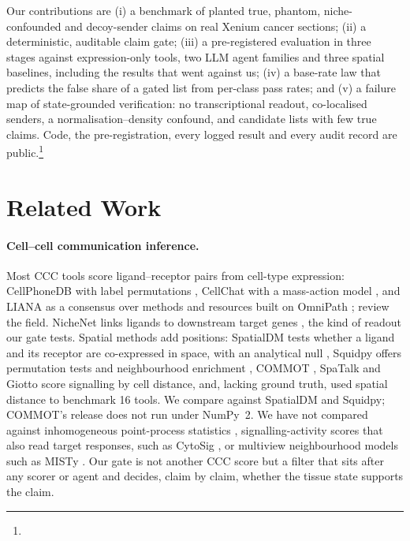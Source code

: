 \documentclass[letterpaper]{article} %
\begin{document}
Our contributions are (i) a benchmark of planted true, phantom, niche-confounded and decoy-sender claims on real
Xenium cancer sections; (ii) a deterministic, auditable claim gate; (iii) a pre-registered evaluation in three stages
against expression-only tools, two LLM agent families and three spatial baselines, including the results that went
against us; (iv) a base-rate law that predicts the false share of a gated list from per-class pass rates; and (v) a
failure map of state-grounded verification: no transcriptional readout, co-localised senders, a
normalisation--density confound, and candidate lists with few true claims. Code, the pre-registration, every logged
result and every audit record are public.\footnote{\repo}

\section{Related Work}
\paragraph{Cell--cell communication inference.} Most CCC tools score ligand--receptor pairs from cell-type
expression: CellPhoneDB with label permutations \cite{efremova2020cellphonedb}, CellChat with a mass-action model
\cite{jin2021cellchat}, and LIANA as a consensus over methods and resources \cite{dimitrov2022liana} built on OmniPath
\cite{turei2021omnipath}; \citeauthor{armingol2021}  review the field. NicheNet links ligands
to downstream target genes \cite{browaeys2020nichenet}, the kind of readout our gate tests. Spatial methods add
positions: SpatialDM tests whether a ligand and its receptor are co-expressed in space, with an analytical null
\cite{li2023spatialdm}, Squidpy offers permutation tests and neighbourhood enrichment \cite{palla2022squidpy}, COMMOT
\cite{cang2023commot}, SpaTalk \cite{shao2022spatalk} and Giotto \cite{dries2021giotto} score signalling by cell
distance, and, lacking ground truth, \citeauthor{liu2022evaluation}  used spatial distance
to benchmark 16 tools. We compare against SpatialDM and Squidpy; COMMOT's release does not run under NumPy~2. We have
not compared against inhomogeneous point-process statistics \cite{baddeley2000inhomogeneous}, signalling-activity
scores that also read target responses, such as CytoSig \cite{jiang2021cytosig}, or multiview neighbourhood models
such as MISTy \cite{tanevski2022misty}. Our gate is not another CCC score but a filter that sits after any scorer or
agent and decides, claim by claim, whether the tissue state supports the claim.
\end{document}
